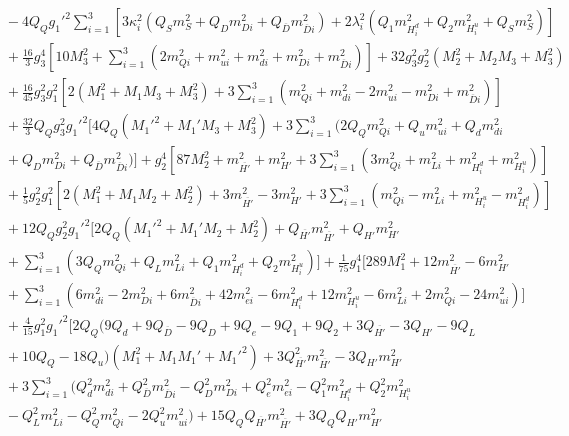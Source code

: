 \documentclass[preprint,amsmath,amssymb,aps,superscriptaddress,prd,showpacs,floatfix,nofootinbib]{revtex4-1}
\begin{document}
\begin{subequations}
\begin{align}
&{}-4Q_Qg_1'^2\sum_{i=1}^3\left [ 3\kappa_i^2\left ( Q_Sm_S^2+Q_Dm_{Di}^2+Q_{\overline{D}}m_{\overline{D}i}^2\right )+2\lambda_i^2\left ( Q_1m_{H_i^d}^2+Q_2m_{H_i^u}^2+Q_Sm_S^2\right )\right ]\nonumber\\
&{}+\frac{16}{3}g_3^4\left [ 10M_3^2+\sum_{i=1}^3\left ( 2m_{Qi}^2+m_{ui}^2+m_{di}^2+m_{Di}^2+m_{\overline{D}i}^2\right )\right ]+32g_3^2g_2^2\left ( M_2^2+M_2M_3+M_3^2\right )\nonumber\\
&{}+\frac{16}{45}g_3^2g_1^2\left [ 2\left ( M_1^2+M_1M_3+M_3^2\right )+3\sum_{i=1}^3\left ( m_{Qi}^2+m_{di}^2-2m_{ui}^2-m_{Di}^2+m_{\overline{D}i}^2\right )\right ]\nonumber\\
&{}+\frac{32}{3}Q_Qg_3^2g_1'^2\bigg [ 4Q_Q\left ( M_1'^2+M_1'M_3+M_3^2 \right )+3\sum_{i=1}^3\big ( 2Q_Qm_{Qi}^2+Q_um_{ui}^2+Q_dm_{di}^2\nonumber\\
&{}+Q_Dm_{Di}^2+Q_{\overline{D}}m_{\overline{D}i}^2 \big )\bigg ]+g_2^4\left [ 87M_2^2+m_{\overline{H'}}^2+m_{H'}^2+3\sum_{i=1}^3\left ( 3m_{Qi}^2+m_{Li}^2+m_{H_i^d}^2+m_{H_i^u}^2\right )\right ]\nonumber\\
&{}+\frac{1}{5}g_2^2g_1^2\left [ 2\left ( M_1^2+M_1M_2+M_2^2 \right )+3m_{\overline{H'}}^2-3m_{H'}^2+3\sum_{i=1}^3\left ( m_{Qi}^2-m_{Li}^2+m_{H_i^u}^2-m_{H_i^d}^2\right )\right ]\nonumber\\
&{}+12Q_Qg_2^2g_1'^2\bigg [ 2Q_Q\left ( M_1'^2+M_1'M_2+M_2^2\right )+Q_{\overline{H'}}m_{\overline{H'}}^2+Q_{H'}m_{H'}^2\nonumber\\
&{}+\sum_{i=1}^3\left ( 3Q_Qm_{Qi}^2+Q_Lm_{Li}^2+Q_1m_{H_i^d}^2+Q_2m_{H_i^u}^2\right )\bigg ]+\frac{1}{75}g_1^4\bigg [ 289M_1^2+12m_{\overline{H'}}^2-6m_{H'}^2\nonumber\\
&{}+\sum_{i=1}^3\left ( 6m_{di}^2-2m_{Di}^2+6m_{\overline{D}i}^2+42m_{ei}^2-6m_{H_i^d}^2+12m_{H_i^u}^2-6m_{Li}^2+2m_{Qi}^2-24m_{ui}^2\right )\bigg ]\nonumber\\
&{}+\frac{4}{15}g_1^2g_1'^2\bigg [ 2Q_Q\big ( 9Q_d+9Q_{\overline{D}}-9Q_D+9Q_e-9Q_1+9Q_2+3Q_{\overline{H'}}-3Q_{H'}-9Q_L\nonumber\\
&{}+10Q_Q-18Q_u\big )\left ( M_1^2+M_1M_1'+M_1'^2\right )+3Q_{\overline{H'}}^2m_{\overline{H'}}^2-3Q_{H'}m_{H'}^2\nonumber\\
&{}+3\sum_{i=1}^3\big ( Q_d^2m_{di}^2+Q_{\overline{D}}^2m_{\overline{D}i}^2-Q_D^2m_{Di}^2+Q_e^2m_{ei}^2-Q_1^2m_{H_i^d}^2+Q_2^2m_{H_i^u}^2\nonumber\\
&{}-Q_L^2m_{Li}^2-Q_Q^2m_{Qi}^2-2Q_u^2m_{ui}^2\big )+15Q_QQ_{\overline{H'}}m_{\overline{H'}}^2+3Q_QQ_{H'}m_{H'}^2\nonumber\\

\end{align}
\end{subequations}
\end{document}

